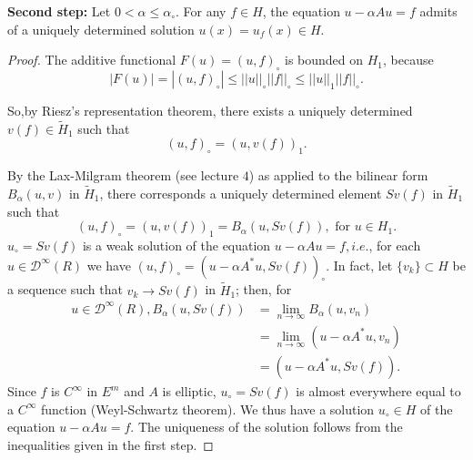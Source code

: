  \medskip
 \noindent
 {\bf Second step:} Let $0 < \alpha \leq \alpha_\circ$. For any $f
 \in H$, the equation $u -\alpha A u =f$ admits of a uniquely
 determined solution $u(x) =u_f (x) \in H$. 
 
\begin{proof}
 The additive functional $F(u) = (u, f)_\circ$ is bounded on $H_1$, because
 $$
 | F (u)| = |(u, f)_\circ | \leq || u ||_\circ || f ||_\circ \leq ||
 u ||_1 || f ||_\circ. 
 $$

 So,\pageoriginale by Riesz's representation theorem, there exists a uniquely
 determined $v (f) \in \tilde{H}_1$ such that 
 $$
 (u, f)_\circ =(u, v(f))_1.
 $$
 
 By the Lax-Milgram theorem (see lecture $4$) as applied to the
 bilinear form $B_\alpha (u, v)$ in $\tilde{H}_1$, there corresponds a
 uniquely determined element $Sv(f)$ in $\tilde{H}_1$ such that 
 $$
 (u, f)_\circ = (u, v(f))_1 = B_\alpha (u, Sv(f)), \text{ for } u \in H_1.
 $$
 $u_\circ =Sv(f)$ is a weak solution of the equation $u - \alpha A u = f,
 i.e$., for each $u \in \mathscr{D}^\infty (R)$ we have $(u, f)_\circ =
 (u -\alpha A^* u, Sv(f))_\circ$. In fact, let $\{v_k\} \subset H$ be a
 sequence such that $v_k \to Sv(f)$ in $\tilde{H}_1$; then, for 
 \begin{align*}
  u \in \mathscr{D}^\infty (R), B_\alpha (u, S v(f)) & = \lim_{n \to
   \infty} B_\alpha (u, v_n)\\ 
  & = \lim_{n \to \infty} (u -\alpha A^* u, v_n)\\
  & = (u- \alpha A^* u, S v (f)).
 \end{align*}
 Since $f$ is $C^\infty$ in $E^m$ and $A$ is elliptic, $u_\circ = S
 v(f)$ is almost everywhere equal to a $C^\infty$ function 
(Weyl-Schwartz theorem). We thus have a solution $u_\circ \in H$ of the
 equation $u -\alpha A u=f$. The uniqueness of the solution follows
 from the inequalities given in the first step. 
\end{proof}

